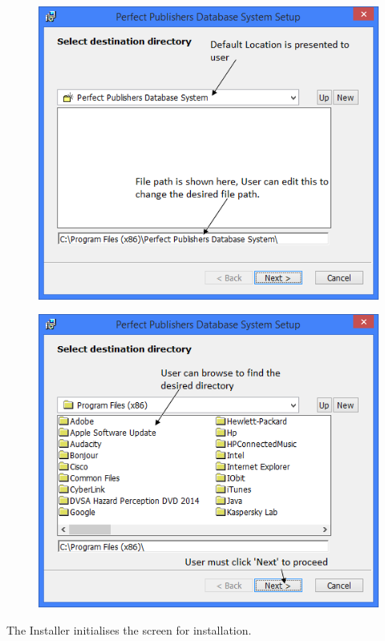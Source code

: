 \begin{figure}[H]
    \includegraphics[width=\textwidth]{./Manual/Installation/Setup.png}
\end{figure}

\begin{figure}[H]
    \includegraphics[width=\textwidth]{./Manual/Installation/Setup2.png}
\end{figure}

The Installer initialises the screen for installation.

